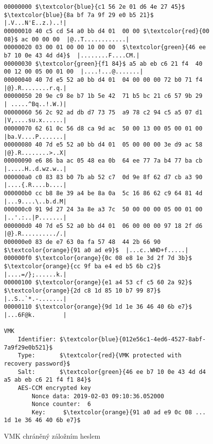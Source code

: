 \begin{figure}[h]
		\centering
		\captionsetup{width=0.65\linewidth}
\begin{lstlisting}[frame=none, escapechar=$, basicstyle=\ttfamily\small, columns=fullflexible, keepspaces=true]
00000000 $\textcolor{blue}{c1 56 2e 01 d6 4e 27 45}$  $\textcolor{blue}{8a bf 7a 9f 29 e0 b5 21}$  |.V...N'E..z.)..!|
00000010 40 c5 cd 54 a0 bb d4 01  00 00 $\textcolor{red}{00 08}$ ac 00 00 00  |@..T............|
00000020 03 00 01 00 00 10 00 00  $\textcolor{green}{46 ee b7 10 0e 43 4d d4}$  |........F....CM.|
00000030 $\textcolor{green}{f1 84}$ a5 ab eb c6 21 f4  40 00 12 00 05 00 01 00  |....!...@.......|
00000040 40 7d e5 52 a0 bb d4 01  04 00 00 00 72 b0 71 f4  |@}.R........r.q.|
00000050 20 9e c9 8e b7 1b 5e 42  71 b5 bc 21 c6 57 9b 29  | .....^Bq..!.W.)|
00000060 56 2c 92 ad db d7 73 75  a9 78 c2 94 c5 a5 07 d1  |V,....su.x......|
00000070 62 61 0c 56 d8 ca 9d ac  50 00 13 00 05 00 01 00  |ba.V....P.......|
00000080 40 7d e5 52 a0 bb d4 01  05 00 00 00 3e d9 ac 58  |@}.R........>..X|
00000090 e6 86 ba ac 05 48 ea 0b  64 ee 77 7a b4 77 ba cb  |.....H..d.wz.w..|
000000a0 c0 83 83 b0 7b ab 52 c7  0d 9e 8f 62 d7 cb a3 90  |....{.R....b....|
000000b0 cc b8 8e 39 a4 be 8a 0a  5c 16 86 62 c9 64 81 4d  |...9....\..b.d.M|
000000c0 91 9d 27 24 3a 8e a3 7c  50 00 00 00 05 00 01 00  |..'.:..|P.......|
000000d0 40 7d e5 52 a0 bb d4 01  06 00 00 00 97 18 2f d6  |@}.R........../.|
000000e0 83 de e7 63 0a fa 57 48  44 2b 66 90 $\textcolor{orange}{91 a0 ad e9}$  |...c..WHD+f.....|
000000f0 $\textcolor{orange}{0c 08 e8 1e 3d 2f 7d 3b}$  $\textcolor{orange}{cc 9f ba e4 ed b5 6b c2}$  |....=/};......k.|
00000100 $\textcolor{orange}{e1 a4 53 cf c5 60 2a 92}$  $\textcolor{orange}{2d c8 1d 85 10 b7 99 87}$  |..S..`*.-.......|
00000110 $\textcolor{orange}{9d 1d 1e 36 46 40 6b e7}$                           |...6F@k.        |

VMK
	Identifier:	$\textcolor{blue}{012e56c1-4ed6-4527-8abf-7a9f29e0b521}$
	Type:		$\textcolor{red}{VMK protected with recovery password}$
	Salt:		$\textcolor{green}{46 ee b7 10 0e 43 4d d4 a5 ab eb c6 21 f4 f1 84}$
	AES-CCM encrypted key
		Nonce data:	2019-02-03 09:10:36.052000
		Nonce counter:	6
		Key:	 $\textcolor{orange}{91 a0 ad e9 0c 08 ... 1d 1e 36 46 40 6b e7}$
\end{lstlisting}
		\caption{VMK chráněný záložním heslem}
		\label{fig:vmk-bpwprotected}
\end{figure}



\label{sec:data-map}

